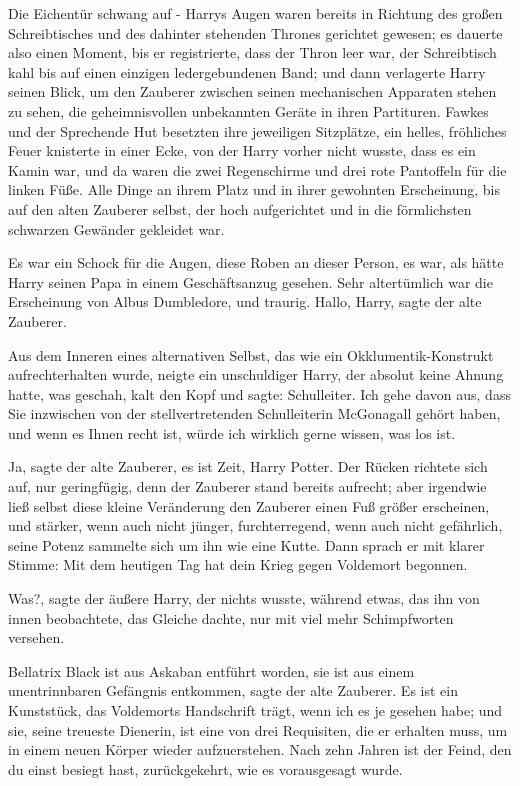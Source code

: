 Die Eichentür schwang auf - Harrys Augen waren bereits in Richtung des großen
Schreibtisches und des dahinter stehenden Thrones gerichtet gewesen; es dauerte
also einen Moment, bis er registrierte, dass der Thron leer war, der
Schreibtisch kahl bis auf einen einzigen ledergebundenen Band; und dann
verlagerte Harry seinen Blick, um den Zauberer zwischen seinen mechanischen
Apparaten stehen zu sehen, die geheimnisvollen unbekannten Geräte in ihren
Partituren. Fawkes und der Sprechende Hut besetzten ihre jeweiligen Sitzplätze,
ein helles, fröhliches Feuer knisterte in einer Ecke, von der Harry vorher nicht
wusste, dass es ein Kamin war, und da waren die zwei Regenschirme und drei rote
Pantoffeln für die linken Füße. Alle Dinge an ihrem Platz und in ihrer gewohnten
Erscheinung, bis auf den alten Zauberer selbst, der hoch aufgerichtet und in die
förmlichsten schwarzen Gewänder gekleidet war.

Es war ein Schock für die Augen, diese Roben an dieser Person, es war, als hätte
Harry seinen Papa in einem Geschäftsanzug gesehen. Sehr altertümlich war die
Erscheinung von Albus Dumbledore, und traurig. \glqq{}Hallo, Harry\grqq{}, sagte
der alte Zauberer.

Aus dem Inneren eines alternativen Selbst, das wie ein Okklumentik-Konstrukt
aufrechterhalten wurde, neigte ein unschuldiger Harry, der absolut keine Ahnung
hatte, was geschah, kalt den Kopf und sagte: \glqq{}Schulleiter. Ich gehe davon
aus, dass Sie inzwischen von der stellvertretenden Schulleiterin McGonagall
gehört haben, und wenn es Ihnen recht ist, würde ich wirklich gerne wissen, was
los ist.\grqq{}

\glqq{}Ja\grqq{}, sagte der alte Zauberer, \glqq{}es ist Zeit, Harry
Potter.\grqq{} Der Rücken richtete sich auf, nur geringfügig, denn der Zauberer
stand bereits aufrecht; aber irgendwie ließ selbst diese kleine Veränderung den
Zauberer einen Fuß größer erscheinen, und stärker, wenn auch nicht jünger,
furchterregend, wenn auch nicht gefährlich, seine Potenz sammelte sich um ihn
wie eine Kutte. Dann sprach er mit klarer Stimme: \glqq{}Mit dem heutigen Tag hat
dein Krieg gegen Voldemort begonnen.\grqq{}

\glqq{}Was?\grqq{}, sagte der äußere Harry, der nichts wusste, während etwas, das
ihn von innen beobachtete, das Gleiche dachte, nur mit viel mehr Schimpfworten
versehen.

\glqq{}Bellatrix Black ist aus Askaban entführt worden, sie ist aus einem
unentrinnbaren Gefängnis entkommen\grqq{}, sagte der alte Zauberer. \glqq{}Es ist
ein Kunststück, das Voldemorts Handschrift trägt, wenn ich es je gesehen habe;
und sie, seine treueste Dienerin, ist eine von drei Requisiten, die er erhalten
muss, um in einem neuen Körper wieder aufzuerstehen. Nach zehn Jahren ist der
Feind, den du einst besiegt hast, zurückgekehrt, wie es vorausgesagt
wurde.\grqq{}

